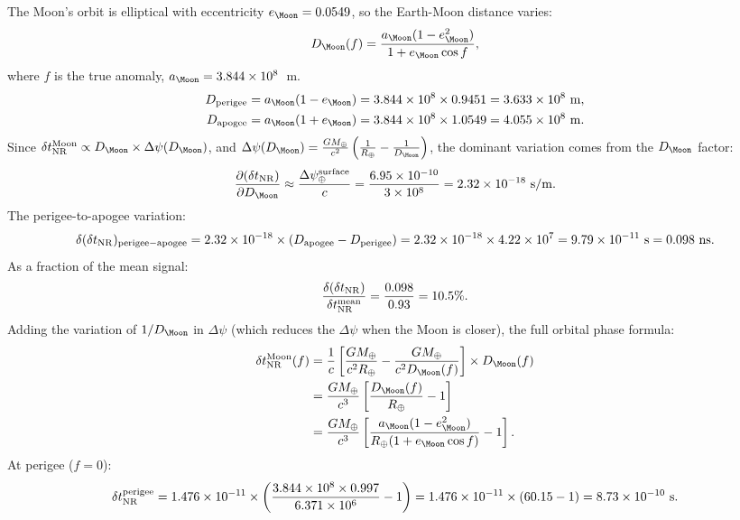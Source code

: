 \documentclass[aps,prd,twocolumn,superscriptaddress,nofootinbib,longbibliography]{revtex4-2}
\begin{document}
The Moon's orbit is elliptical with eccentricity $e_\Moon = 0.0549$, so
the Earth-Moon distance varies:
\begin{equation}
D_\Moon(f) = \frac{a_\Moon(1 - e_\Moon^2)}{1 + e_\Moon\cos f},
\end{equation}
where $f$ is the true anomaly, $a_\Moon = 3.844\times10^8$~m.
\begin{align}
D_{\rm perigee} &= a_\Moon(1-e_\Moon) = 3.844\times10^8\times0.9451 = 3.633\times10^8\ \si{m},
\nonumber\\
D_{\rm apogee} &= a_\Moon(1+e_\Moon) = 3.844\times10^8\times1.0549 = 4.055\times10^8\ \si{m}.
\end{align}
Since $\delta t_{\rm NR}^{\rm Moon} \propto D_\Moon\times\Delta\psi(D_\Moon)$,
and $\Delta\psi(D_\Moon) = \frac{GM_\oplus}{c^2}\left(\frac{1}{R_\oplus}
- \frac{1}{D_\Moon}\right)$, the dominant variation comes from the $D_\Moon$ factor:
\begin{equation}
\frac{\partial(\delta t_{\rm NR})}{\partial D_\Moon}
\approx \frac{\Delta\psi_\oplus^{\rm surface}}{c}
= \frac{6.95\times10^{-10}}{3\times10^8} = 2.32\times10^{-18}\ \si{s/m}.
\end{equation}
The perigee-to-apogee variation:
\begin{equation}
\delta(\delta t_{\rm NR})_{\rm perigee-apogee}
= 2.32\times10^{-18}\times(D_{\rm apogee} - D_{\rm perigee})
= 2.32\times10^{-18}\times4.22\times10^7
= 9.79\times10^{-11}\ \si{s} = 0.098\ \si{ns}.
\end{equation}
As a fraction of the mean signal:
\begin{equation}
\frac{\delta(\delta t_{\rm NR})}{\delta t_{\rm NR}^{\rm mean}}
= \frac{0.098}{0.93} = 10.5\%.
\end{equation}
Adding the variation of $1/D_\Moon$ in $\Delta\psi$ (which reduces the
$\Delta\psi$ when the Moon is closer), the full orbital phase formula:
\begin{align}
\delta t_{\rm NR}^{\rm Moon}(f)
&= \frac{1}{c}\left[\frac{GM_\oplus}{c^2 R_\oplus}
- \frac{GM_\oplus}{c^2 D_\Moon(f)}\right]\times D_\Moon(f)
\nonumber\\
&= \frac{GM_\oplus}{c^3}\left[\frac{D_\Moon(f)}{R_\oplus} - 1\right]
\nonumber\\
&= \frac{GM_\oplus}{c^3}
\left[\frac{a_\Moon(1-e_\Moon^2)}{R_\oplus(1+e_\Moon\cos f)} - 1\right].
\end{align}
At perigee ($f = 0$):
\begin{equation}
\delta t_{\rm NR}^{\rm perigee}
= 1.476\times10^{-11}\times\left(\frac{3.844\times10^8\times0.997}{6.371\times10^6} - 1\right)
= 1.476\times10^{-11}\times(60.15 - 1)
= 8.73\times10^{-10}\ \si{s}.
\end{equation}
\end{document}
